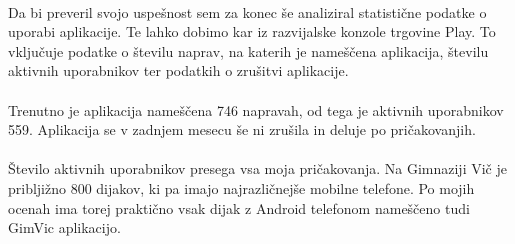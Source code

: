 \paragraph{}Da bi preveril svojo uspešnost sem za konec še analiziral statistične podatke o uporabi aplikacije. Te lahko dobimo kar iz razvijalske konzole trgovine Play. To vključuje podatke o številu naprav, na katerih je nameščena aplikacija, številu aktivnih uporabnikov ter podatkih o zrušitvi aplikacije.

\paragraph{}Trenutno je aplikacija nameščena 746 napravah, od tega je aktivnih uporabnikov 559. Aplikacija se v zadnjem mesecu še ni zrušila in deluje po pričakovanjih.

\paragraph{}Število aktivnih uporabnikov presega vsa moja pričakovanja. Na Gimnaziji Vič je pribljižno 800 dijakov, ki pa imajo najrazličnejše mobilne telefone. Po mojih ocenah ima torej praktično vsak dijak z Android telefonom nameščeno tudi GimVic aplikacijo.
